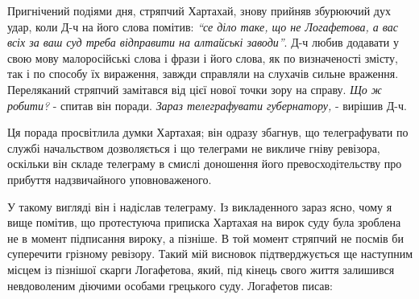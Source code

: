 \documentclass[a4paper,20pt]{report}
\begin{document}
Пригнічений подіями дня, стряпчий Хартахай, знову прийняв збурюючий дух
удар, коли Д-ч на його слова помітив: \emph{``се діло таке, що не Логафетова, а вас всіх
за ваш суд треба відправити на алтайські заводи''}. Д-ч любив додавати у свою
мову малоросійські слова і фрази і його слова, як по визначеності змісту, так і по способу
їх вираження, завжди справляли на слухачів сильне враження. Переляканий стряпчий замітався
від цієї нової точки зору на справу. \emph{Що ж робити?} - спитав він поради. \emph{Зараз телеграфувати
губернатору,} - вирішив Д-ч.


Ця порада просвітлила думки Хартахая; він одразу збагнув, що телеграфувати по
службі начальством дозволяється і що телеграми не викличе гніву ревізора,
оскільки він складе телеграму в смислі доношення його превосходітельству про
прибуття надзвичайного уповноваженого.

У такому вигляді він і надіслав телеграму. Із викладенного зараз ясно, чому я вище помітив, що
протестуюча приписка Хартахая на вирок суду була зроблена не в момент підписання вироку, а пізніше. В той
момент стряпчий не посмів би суперечити грізному ревізору. Такий мій висновок підтверджується
ще наступним місцем із пізнішої скарги Логафетова, який, під кінець свого життя
залишився невдоволеним діючими особами грецького суду. Логафетов писав:
\end{document}
